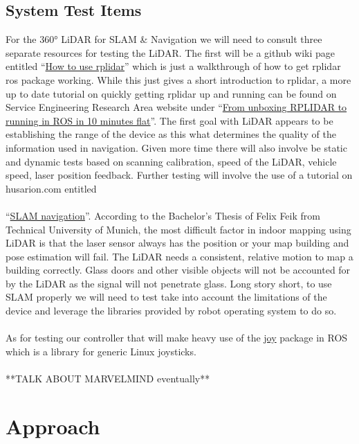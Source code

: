 \documentclass[english,12pt]{article}
\begin{document}
\subsection{System Test Items}
For the \ang{360} LiDAR for SLAM \& Navigation we will need to consult three separate 
resources for testing the LiDAR. The first will be a github wiki page entitled 
``\href{https://github.com/robopeak/rplidar_ros/wiki/How-to-use-rplidar}{How to use rplidar}'' 
which is just a walkthrough of how to get rplidar ros package working. While this just gives 
a short introduction to rplidar, a more up to date tutorial on quickly getting rplidar up and 
running can be found on Service Engineering Research Area website under 
``\href{https://blog.zhaw.ch/icclab/rplidar/}{From unboxing RPLIDAR to running in ROS in 10 
minutes flat}''. The first goal with LiDAR appears to be establishing the range of the device 
as this what determines the quality of the information used in navigation. Given more time 
there will also involve be static and dynamic tests based on scanning calibration, 
speed of the LiDAR, vehicle speed, laser position feedback. Further testing will involve the use 
of a tutorial on husarion.com entitled \\\\
``\href{https://husarion.com/tutorials/ros-tutorials/6-slam-navigation/}{SLAM navigation}''. 
According to the Bachelor's Thesis of Felix Feik from Technical University of Munich,
the most difficult factor in indoor mapping using LiDAR is that the laser sensor always has 
the position or your map building and pose estimation will fail. The LiDAR needs a consistent, 
relative motion to map a building correctly. Glass doors and other visible objects will not 
be accounted for by the LiDAR as the signal will not penetrate glass. Long story short, to use 
SLAM properly we will need to test take into account the limitations of the device and leverage 
the libraries provided by robot operating system to do so. \\\\

\noindent As for testing our controller that will make heavy use of the 
\href{http://wiki.ros.org/joy#Microsoft_Xbox_360_Wired_Controller_for_Linux}{joy} 
package in ROS which is a library for generic Linux joysticks. \\\\
**TALK ABOUT MARVELMIND eventually**
\section{Approach}
\end{document}
